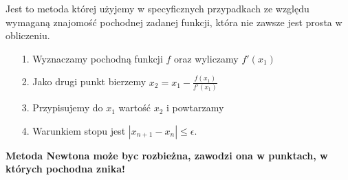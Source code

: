 \documentclass{article}
\begin{document}
Jest to metoda której użyjemy w specyficznych przypadkach ze względu wymaganą znajomość pochodnej zadanej funkcji, która nie zawsze jest prosta w obliczeniu.

\begin{enumerate}
  \item[1.]Wyznaczamy pochodną funkcji $f$ oraz wyliczamy $f'(x_1)$
  \item[2.]Jako drugi punkt bierzemy $x_2 = x_1 - \frac{f(x_1)}{f'(x_1)} $
  \item[3.]Przypisujemy do $x_1$ wartość $x_2$ i powtarzamy 
  \item[4.]Warunkiem stopu jest $|x_{n+1} - x_{n}| \leq \epsilon $.
\end{enumerate}

\textbf{Metoda Newtona może byc rozbieżna, zawodzi ona w punktach, w których pochodna znika!}

\newpage
\end{document}

